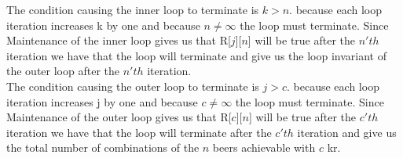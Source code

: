 \documentclass[12pt]{article}
\begin{document}
The condition causing the inner loop to terminate is $k > n$. because each loop iteration increases k by one and because $n \neq \infty$ the loop must terminate. Since Maintenance of the inner loop gives us that R[$j$][$n$] will be true after the $n'th$ iteration we have that the loop will terminate and give us the loop invariant of the outer loop after the $n'th$ iteration.\\

The condition causing the outer loop to terminate is $j > c$. because each loop iteration increases j by one and because $c \neq \infty$ the loop must terminate. Since Maintenance of the outer loop gives us that R[$c$][$n$] will be true after the $c'th$ iteration we have that the loop will terminate after the $c'th$  iteration and give us the total number of combinations of the $n$ beers achievable with $c$ kr.\\



\end{document}
